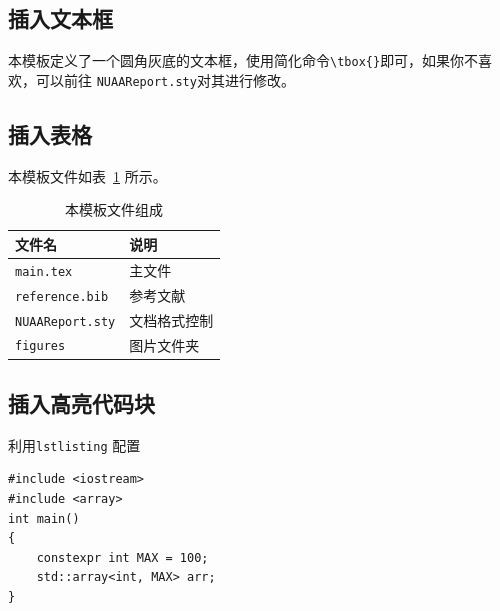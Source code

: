 \documentclass[12pt,hyperref,a4paper,UTF8]{ctexart}
\begin{document}
\subsection{插入文本框}
本模板定义了一个圆角灰底的文本框，使用简化命令\verb|\tbox{}|即可，如果你不喜欢，可以前往 \texttt{NUAAReport.sty}对其进行修改。


\subsection{插入表格}
本模板文件如表~\ref{doc} 所示。
\begin{table}[!htbp]
    \centering
    \begin{tabular}{l  | l}
    \hline
        文件名 & 说明 \\
        \hline
        \texttt{main.tex}  & 主文件 \\
        \texttt{reference.bib} & 参考文献 \\
        \texttt{NUAAReport.sty}  & 文档格式控制\\
        \texttt{figures}  & 图片文件夹 \\
        \hline
    \end{tabular}
    \caption{本模板文件组成}
    \label{doc}
\end{table}

%
%
%
%
%
%

\subsection{插入高亮代码块}
利用\verb|lstlisting| 配置
\begin{lstlisting}[style=CPP, title="c++代码"]
#include <iostream>
#include <array>
int main()
{
    constexpr int MAX = 100;
    std::array<int, MAX> arr;
}  
\end{lstlisting}
\end{document}
